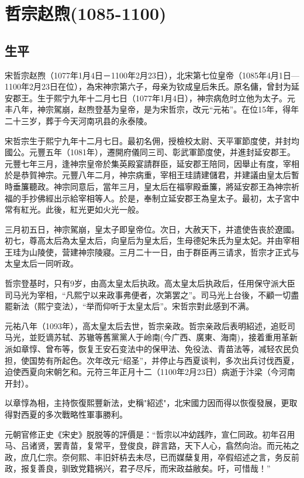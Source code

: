 
\section{哲宗赵煦\tiny(1085-1100)}

\subsection{生平}

宋哲宗赵煦（1077年1月4日－1100年2月23日），北宋第七位皇帝（1085年4月1日—1100年2月23日在位），為宋神宗第六子，母亲为钦成皇后朱氏。原名傭，曾封为延安郡王。生于熙宁九年十二月七日（1077年1月4日），神宗病危时立他为太子。元丰八年，神宗駕崩，赵煦登基为皇帝，是为宋哲宗，改元“元祐”。在位15年，得年二十三岁，葬于今天河南巩县的永泰陵。

宋哲宗生于熙宁九年十二月七日。最初名佣，授檢校太尉、天平軍節度使，并封均國公。元豐五年（1081年），遷開府儀同三司、彰武軍節度使，并進封延安郡王。元豐七年三月，逢神宗皇帝於集英殿宴請群臣，延安郡王陪同，因舉止有度，宰相於是恭賀神宗。元豐八年二月，神宗病重，宰相王珪請建儲君，并建議由皇太后暫時垂簾聽政。神宗同意后，當年三月，皇太后在福寧殿垂簾，將延安郡王為神宗祈福的手抄佛經出示給宰相等人。於是，奉制立延安郡王為皇太子。最初，太子宮中常有紅光。此後，紅光更如火光一般。

三月初五日，神宗駕崩，皇太子即皇帝位。次日，大赦天下，并遣使告丧於遼國。初七，尊高太后為太皇太后，向皇后为皇太后，生母德妃朱氏为皇太妃。并由宰相王珪为山陵使，营建神宗陵寢。三月二十一日，由于群臣再三请求，哲宗才正式与太皇太后一同听政。

哲宗登基时，只有9岁，由高太皇太后执政。高太皇太后执政后，任用保守派大臣司马光为宰相，“凡熙宁以来政事弗便者，次第罢之”。司马光上台後，不顧一切盡罷新法（熙宁变法），“举而仰听于太皇太后”。宋哲宗對此感到不满。

元祐八年（1093年），高太皇太后去世，哲宗亲政。哲宗亲政后表明紹述，追贬司马光，並贬谪苏轼、苏辙等舊黨黨人于岭南(今广西、廣東、海南)，接着重用革新派如章惇、曾布等，恢复王安石变法中的保甲法、免役法、青苗法等，减轻农民负担，使国势有所起色。次年改元“绍圣”，并停止与西夏谈判，多次出兵讨伐西夏，迫使西夏向宋朝乞和。元符三年正月十二（1100年2月23日）病逝于汴梁（今河南开封）。

以章惇為相，主持恢復熙豐新法，史稱"紹述"，北宋國力因而得以恢復發展，更取得對西夏的多次戰略性軍事勝利。

元朝官修正史《宋史》脱脱等的評價是：“哲宗以冲幼践阼，宣仁同政。初年召用马、吕诸贤，罢青苗，复常平，登俊良，辟言路，天下人心，翕然向治。而元祐之政，庶几仁宗。奈何熙、丰旧奸枿去未尽，已而媒蘖复用，卒假绍述之言，务反前政，报复善良，驯致党籍祸兴，君子尽斥，而宋政益敝矣。吁，可惜哉！”

